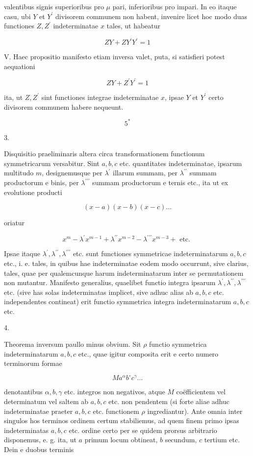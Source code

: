 \documentclass[10pt]{article}
\begin{document}
valentibus signis superioribus pro \(\mu\) pari, inferioribus pro impari. In eo itaque casu, ubi \(Y\) et \(Y^{\prime}\) divisorem communem non habent, invenire licet hoc modo duas functiones \(Z, Z^{\prime}\) indeterminatae \(x\) tales, ut habeatur

\[
Z Y+Z Y^{\prime} Y^{\prime}=1
\]

V. Haec propositio manifesto etiam inversa valet, puta, si satisfieri potest aequationi

\[
Z Y+Z^{\prime} Y^{\prime}=1
\]

ita, ut \(Z, Z^{\prime}\) sint functiones integrae indeterminatae \(x\), ipsae \(Y\) et \(Y^{\prime}\) certo divisorem communem habere nequeunt.

\[
5^{*}
\]

3.

Disquisitio praeliminaris altera circa transformationem functionum symmetricarum versabitur. Sint \(a, b, c\) etc. quantitates indeterminatae, ipsarum multitudo \(m\), designemusque per \(\lambda^{\prime}\) illarum summam, per \(\lambda^{\prime \prime}\) summam productorum \(\mathrm{e}\) binis, per \(\lambda^{\prime \prime \prime}\) summam productorum e ternis etc., ita ut ex evolutione producti

\[
(x-a)(x-b)(x-c) \ldots
\]

oriatur

\[
x^{m}-\lambda^{\prime} x^{m-1}+\lambda^{\prime \prime} x^{m-2}-\lambda^{\prime \prime \prime} x^{m-3}+\text { etc. }
\]

Ipsae itaque \(\lambda^{\prime}, \lambda^{\prime \prime}, \lambda^{\prime \prime \prime}\) etc. sunt functiones symmetricae indeterminatarum \(a, b, c\) etc., i. e. tales, in quibus hae indeterminatae eodem modo occurrunt, sive clarius, tales, quae per qualemcunque harum indeterminatarum inter se permutationem non mutantur. Manifesto generalius, quaelibet functio integra ipsarum \(\lambda^{\prime}, \lambda^{\prime \prime}, \lambda^{\prime \prime \prime}\) etc. (sive has solas indeterminatas implicet, sive adhuc alias ab \(a, b, c\) etc. independentes contineat) erit functio symmetrica integra indeterminatarum \(a, b, c\) etc.

4.

Theorema inversum paullo minus obvium. Sit \(\rho\) functio symmetrica indeterminatarum \(a, b, c\) etc., quae igitur composita erit e certo numero terminorum formae

\[
M a^{\alpha} b^{\circ} c^{\gamma} \ldots
\]

denotantibus \(\alpha, b, \gamma\) etc. integros non negativos, atque \(M\) coëfficientem vel determinatum vel saltem ab \(a, b, c\) etc. non pendentem (si forte aliae adhuc indeterminatae praeter \(a, b, c\) etc. functionem \(\rho\) ingrediantur). Ante omnia inter singulos hos terminos ordinem certum stabiliemus, ad quem finem primo ipsas indeterminatas \(a, b, c\) etc. ordine certo per se quidem prorsus arbitrario disponemus, e. g. ita, ut \(a\) primum locum obtineat, \(b\) secundum, \(c\) tertium etc. Dein e duobus terminis
\end{document}
